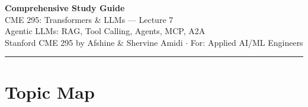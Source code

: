 \documentclass[11pt, a4paper]{article}
\begin{document}
\begin{center}
{\LARGE\bfseries\color{defblue} Comprehensive Study Guide}\\[6pt]
{\Large CME 295: Transformers \& LLMs --- Lecture 7}\\[4pt]
{\normalsize Agentic LLMs: RAG, Tool Calling, Agents, MCP, A2A}\\[4pt]
{\small Stanford CME 295 by Afshine \& Shervine Amidi $\cdot$ For: Applied AI/ML Engineers}\\[2pt]
\rule{\textwidth}{0.4pt}
\end{center}

\tableofcontents
\newpage

\section{Topic Map}
\end{document}
